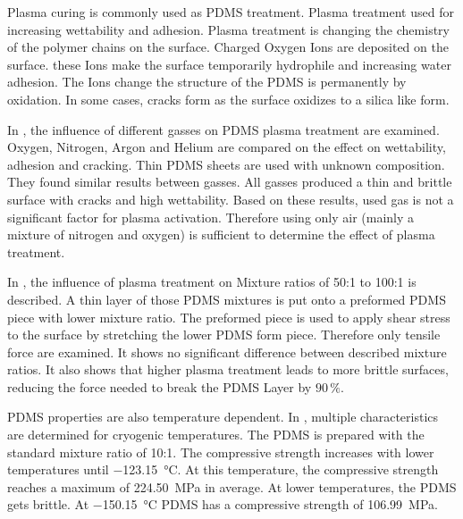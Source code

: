 Plasma curing is commonly used as PDMS treatment. Plasma treatment used for increasing wettability and adhesion. Plasma treatment is changing the chemistry of the polymer chains on the surface. Charged Oxygen Ions are deposited on the surface. these Ions make the surface temporarily hydrophile and increasing water adhesion. The Ions change the structure of the PDMS is permanently by oxidation. In some cases, cracks form as the surface oxidizes to a silica like form.

In \cite{Owen.1994}, the influence of different gasses on PDMS plasma treatment are examined. Oxygen, Nitrogen, Argon and Helium are compared on the effect on wettability, adhesion and cracking. Thin PDMS sheets are used with unknown composition. They found similar results between gasses. All gasses produced a thin and brittle surface with cracks and high wettability. Based on these results, used gas is not a significant factor for plasma activation. Therefore using only air (mainly a mixture of nitrogen and oxygen) is sufficient to determine the effect of plasma treatment.

In \cite{Ohishi.2017}, the influence of plasma treatment on Mixture ratios of 50:1 to 100:1 is described. A thin layer of those PDMS mixtures is put onto a preformed PDMS piece with lower mixture ratio. The preformed piece is used to apply shear stress to the surface by stretching the lower PDMS form piece. Therefore only tensile force are examined. It shows no significant difference between described mixture ratios. It also shows that higher plasma treatment leads to more brittle surfaces, reducing the force needed to break the PDMS Layer by $90\,\%$.

PDMS properties are also temperature dependent. In \cite{Zhang.2020}, multiple characteristics are determined for cryogenic temperatures. The PDMS is prepared with the standard mixture ratio of 10:1. The compressive strength increases with lower temperatures until \SI{-123.15}{\degreeCelsius}. At this temperature, the compressive strength reaches a maximum of \SI{224.50}{\mega\pascal} in average. At lower temperatures, the PDMS gets brittle. At \SI{-150.15}{\degreeCelsius} PDMS has a compressive strength of \SI{106.99}{\mega\pascal}.



